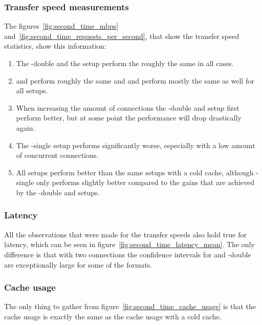 \documentclass[twoside,openright]{uva-bachelor-thesis}
\begin{document}
\subsubsection{Transfer speed measurements}
The figures~\ref{fig:second_time_mbps}
and~\ref{fig:second_time_requests_per_second}, that show the transfer speed
statistics, show this information:
\begin{enumerate}
    \item
        The \lt-double and the \cdn setup perform the roughly the same in all
        cases.

    \item
        \dash and \iss perform roughly the same and \hds and \hls perform mostly
        the same as well for all setups.

    \item
        When increasing the amount of connections the \lt-double and \cdn setup
        first perform better, but at some point the performance will drop
        drastically again.

    \item
        The \lt-single setup performs significantly worse, especially with a low
        amount of concurrent connections.

    \item
        All setups perform better than the same setups with a cold cache,
        although \lt-single only performs slightly better compared to the gains
        that are achieved by the \lt-double and \cdn setups.

\end{enumerate}


\FloatBarrier

\subsubsection{Latency}
All the observations that were made for the transfer speeds also hold true for
latency, which can be seen in figure~\ref{fig:second_time_latency_mean}. The
only difference is that with two connections the confidence intervals for \cdn
and \lt-double are exceptionally large for some of the formats.

\FloatBarrier

\subsubsection{Cache usage}
The only thing to gather from figure~\ref{fig:second_time_cache_usage} is that
the cache usage is exactly the same as the cache usage with a cold cache.

\end{document}
